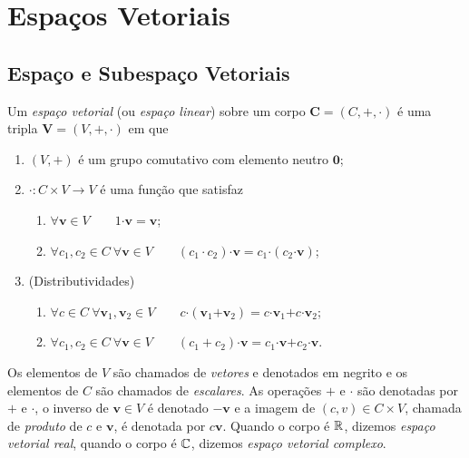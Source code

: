 \chapter{Espaços Vetoriais}

\section{Espaço e Subespaço Vetoriais}

\begin{defi}
	Um \emph{espaço vetorial} (ou \emph{espaço linear}) sobre um corpo $\bm C=(C,+,\cdot)$ é uma tripla $\bm V = (V, \bm +, \bm \cdot)$ em que
	\begin{enumerate}
	\item $(V,\bm +)$ é um grupo comutativo com elemento neutro $\bm 0$;
	\item $\bm \cdot: C \times V \to V$ é uma função que satisfaz
		\begin{enumerate}
		\item $\forall \bm v \in V \qquad 1\bm\cdot \bm v=\bm v$;
		\item $\forall c_1,c_2 \in C \ \forall \bm v \in V \qquad (c_1 \cdot c_2) \bm\cdot \bm v = c_1 \bm\cdot(c_2 \bm\cdot \bm v)$;
		\end{enumerate}
	\item (Distributividades)
		\begin{enumerate}
		\item $\forall c \in C \ \forall \bm v_1,\bm v_2 \in V \qquad c \bm\cdot (\bm v_1 \bm + \bm v_2) = c \bm\cdot \bm v_1 \bm + c\bm\cdot \bm v_2$;
		\item $\forall c_1,c_2 \in C \ \forall \bm v \in V \qquad (c_1+c_2) \bm\cdot \bm v = c_1 \bm{\cdot v} \bm + c_2\bm{\cdot v}$.
		\end{enumerate}
	\end{enumerate}
Os elementos de $V$ são chamados de \emph{vetores} e denotados em negrito e os elementos de $C$ são chamados de \emph{escalares}. As operações $\bm +$ e $\bm \cdot$ são denotadas por $+$ e $\cdot$, o inverso de $\bm v \in V$ é denotado $- \bm v$ e a imagem de $(c,v) \in C \times V$, chamada de \emph{produto} de $c$ e $\bm v$, é denotada por $c\bm v$. Quando o corpo é $\mathbb{R}$, dizemos \emph{espaço vetorial real}, quando o corpo é $\mathbb{C}$, dizemos \emph{espaço vetorial complexo}.
\end{defi}

